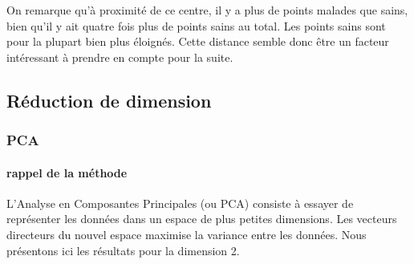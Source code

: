 \documentclass[a4paper,10pt]{report}
\begin{document}
On remarque qu'à proximité de ce centre, il y a plus de points malades que sains, bien qu'il y ait quatre fois plus de points sains au total. Les points sains sont pour la plupart bien plus éloignés. Cette distance semble donc être un facteur intéressant à prendre en compte pour la suite.


\subsection{Réduction de dimension}
\subsubsection{PCA}
\paragraph{rappel de la méthode }
L'Analyse en Composantes Principales (ou PCA) consiste à essayer de représenter les données dans un espace de plus petites dimensions. Les vecteurs directeurs du nouvel espace maximise la variance entre les données. Nous présentons ici les résultats pour la dimension 2.
\end{document}
